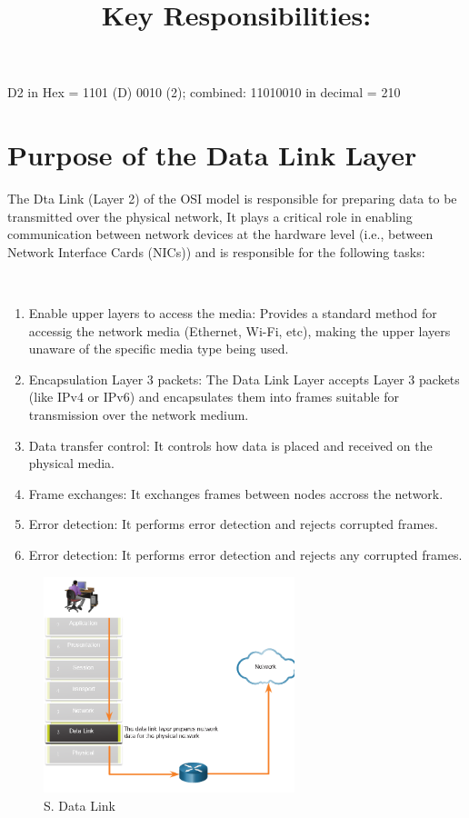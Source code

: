\documentclass[a4paper,11pt]{article}
\begin{document}
\begin{tcolorbox}[colframe=gray!80, colback=gray!20, coltitle=black, title= Example: ]
D2 in Hex = 1101 (D) 0010 (2); combined: 11010010 in decimal = 210
\end{tcolorbox}

\newpage
\section{Purpose of the Data Link Layer}
The Dta Link (Layer 2) of the OSI model is responsible for preparing data to be transmitted over the physical network, It plays a critical role in enabling communication between network devices at the hardware level (i.e., between Network Interface Cards (NICs)) and is responsible for the following tasks:\\

\title{Key Responsibilities:}\\
\begin{enumerate}
    \item Enable upper layers to access the media: Provides a standard method for accessig the network media (Ethernet, Wi-Fi, etc), making the upper layers unaware of the specific media type being used.\\
    \item Encapsulation Layer 3 packets: The Data Link Layer accepts Layer 3 packets (like IPv4 or IPv6) and encapsulates them into frames suitable for transmission over the network medium.\\
    \item Data transfer control: It controls how  data is placed and received on the physical media.\\
    \item Frame exchanges: It exchanges frames between nodes accross the network.\\
    \item Error detection: It performs error detection and rejects corrupted frames.
    \item Error detection: It performs error detection and rejects any corrupted frames.\\
\end{enumerate}

\begin{figure}[h!]
    \centering
    \includegraphics[width=0.65\textwidth]{15.png}
    \caption{S. Data Link}
    \label{fig:cap1}
\end{figure}
\end{document}
